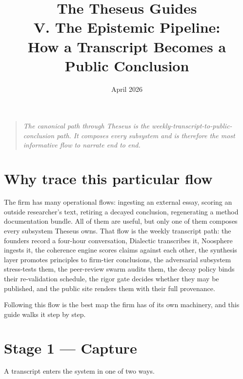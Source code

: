 \documentclass[11pt,letterpaper]{article}
\title{\textbf{The Theseus Guides}\\[6pt]\large V. The Epistemic Pipeline:\\How a Transcript Becomes a Public Conclusion}
\date{April 2026}
\author{}
\begin{document}
\maketitle
\thispagestyle{empty}

\begin{quote}\itshape
The canonical path through Theseus is the weekly-transcript-to-public-conclusion path. It composes every subsystem and is therefore the most informative flow to narrate end to end.
\end{quote}

\vspace{1em}
\tableofcontents
\newpage

\section{Why trace this particular flow}

The firm has many operational flows: ingesting an external essay, scoring an outside researcher's text, retiring a decayed conclusion, regenerating a method documentation bundle. All of them are useful, but only one of them composes every subsystem Theseus owns. That flow is the weekly transcript path: the founders record a four-hour conversation, Dialectic transcribes it, Noosphere ingests it, the coherence engine scores claims against each other, the synthesis layer promotes principles to firm-tier conclusions, the adversarial subsystem stress-tests them, the peer-review swarm audits them, the decay policy binds their re-validation schedule, the rigor gate decides whether they may be published, and the public site renders them with their full provenance.

Following this flow is the best map the firm has of its own machinery, and this guide walks it step by step.

\section{Stage 1 --- Capture}

A transcript enters the system in one of two ways.
\end{document}
